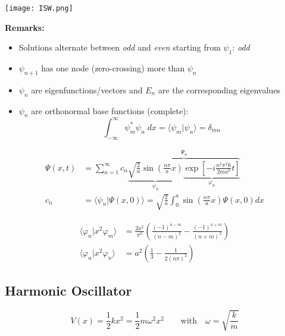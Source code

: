 \begin{center}
    \texttt{[image: ISW.png]}
\end{center}

\textbf{Remarks:}
\begin{itemize}
    \item Solutions alternate between \textit{odd} and \textit{even} starting from $\psi_1$: \textit{odd}
    \item $\psi_{n+1}$ has one node (zero-crossing) more than $\psi_n$
    \item $\psi_n$ are eigenfunctions/vectors and $E_n$ are the corresponding eigenvalues
    \item $\psi_n$ are orthonormal base functions (complete):
          \noindent\begin{equation*}
              \int_{-\infty}^{\infty} \psi_m^*\psi_n\; dx =\langle \psi_m|\psi_n\rangle= \delta_{mn}
          \end{equation*}
\end{itemize}

\noindent\begin{align*}
    \Psi(x,t) & =\sum_{n=1}^{\infty}c_{n} \overbrace{\underbrace{\sqrt{\frac{2}{a}}\sin\left(\frac{n\pi}{a}x\right)}_{\psi_n} \underbrace{\exp\left[-i\frac{n^{2}\pi^{2}\hbar}{2ma^{2}}t\right]}_{\varphi_n}}^{\Psi_n} \\
    c_n       & =\langle \psi_n|\Psi(x,0)\rangle = \sqrt{\frac{2}{a}}\int_0^a\sin\left(\frac{n\pi}{a}x\right)\Psi(x,0)dx
\end{align*}

\noindent\begin{align*}
    \langle \varphi_n|x^2\varphi_m\rangle & = \frac{2a^2}{\pi^2}\left(\frac{{(-1)}^{n-m}}{{(n-m)}^2}-\frac{{(-1)}^{n+m}}{{(n+m)}^2}\right) \\
    \langle \varphi_n|x^2\varphi_n\rangle & = a^2\left(\frac{1}{3} -\frac{1}{2{(n\pi)}^2}\right)
\end{align*}

\subsection{Harmonic Oscillator}
\begin{equation*}
    V(x) = \frac{1}{2}k x^2 = \frac{1}{2}m \omega^2 x^2 \qquad \text{with} \quad \omega = \sqrt{\frac{k}{m}}
\end{equation*}

